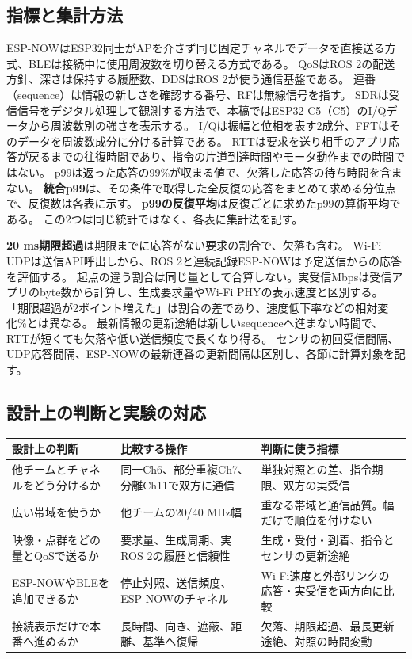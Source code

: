 \documentclass[a4paper,10pt]{ltjsarticle}
\begin{document}
\subsection{指標と集計方法}
ESP-NOWはESP32同士がAPを介さず同じ固定チャネルでデータを直接送る方式、BLEは接続中に使用周波数を切り替える方式である。
QoSはROS 2の配送方針、深さは保持する履歴数、DDSはROS 2が使う通信基盤である。
連番（sequence）は情報の新しさを確認する番号、RFは無線信号を指す。
SDRは受信信号をデジタル処理して観測する方法で、本稿ではESP32-C5（C5）のI/Qデータから周波数別の強さを表示する。
I/Qは振幅と位相を表す2成分、FFTはそのデータを周波数成分に分ける計算である。
RTTは要求を送り相手のアプリ応答が戻るまでの往復時間であり、指令の片道到達時間やモータ動作までの時間ではない。
p99は返った応答の99\%が収まる値で、欠落した応答の待ち時間を含まない。
\textbf{統合p99}は、その条件で取得した全反復の応答をまとめて求める分位点で、反復数は各表に示す。
\textbf{p99の反復平均}は反復ごとに求めたp99の算術平均である。
この2つは同じ統計ではなく、各表に集計法を記す。

\textbf{20 ms期限超過}は期限までに応答がない要求の割合で、欠落も含む。
Wi-Fi UDPは送信API呼出しから、ROS 2と連続記録ESP-NOWは予定送信からの応答を評価する。
起点の違う割合は同じ量として合算しない。実受信Mbpsは受信アプリのbyte数から計算し、生成要求量やWi-Fi PHYの表示速度と区別する。
「期限超過が2ポイント増えた」は割合の差であり、速度低下率などの相対変化\%とは異なる。
最新情報の更新途絶は新しいsequenceへ進まない時間で、RTTが短くても欠落や低い送信頻度で長くなり得る。
センサの初回受信間隔、UDP応答間隔、ESP-NOWの最新連番の更新間隔は区別し、各節に計算対象を記す。

\subsection{設計上の判断と実験の対応}
\begin{center}\small
\begin{tabular}{p{.25\linewidth}p{.33\linewidth}p{.32\linewidth}}\toprule
設計上の判断 & 比較する操作 & 判断に使う指標\\\midrule
他チームとチャネルをどう分けるか & 同一Ch6、部分重複Ch7、分離Ch11で双方に通信 & 単独対照との差、指令期限、双方の実受信\\
広い帯域を使うか & 他チームの20/40 MHz幅 & 重なる帯域と通信品質。幅だけで順位を付けない\\
映像・点群をどの量とQoSで送るか & 要求量、生成周期、実ROS 2の履歴と信頼性 & 生成・受付・到着、指令とセンサの更新途絶\\
ESP-NOWやBLEを追加できるか & 停止対照、送信頻度、ESP-NOWのチャネル & Wi-Fi速度と外部リンクの応答・実受信を両方向に比較\\
接続表示だけで本番へ進めるか & 長時間、向き、遮蔽、距離、基準へ復帰 & 欠落、期限超過、最長更新途絶、対照の時間変動\\\bottomrule
\end{tabular}\end{center}
\end{document}

